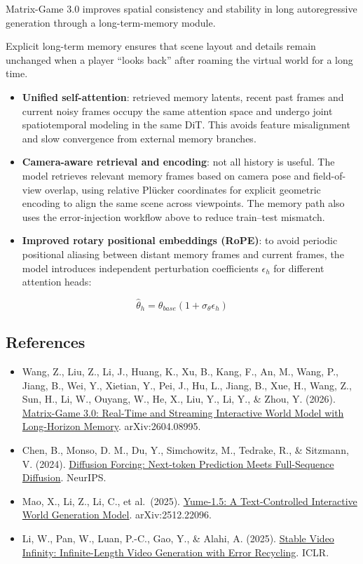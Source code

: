 Matrix-Game 3.0 improves spatial consistency and stability in long autoregressive generation through a long-term-memory module.

Explicit long-term memory ensures that scene layout and details remain unchanged when a player ``looks back'' after roaming the virtual world for a long time.

\begin{itemize}
\tightlist
\item
  \textbf{Unified self-attention}: retrieved memory latents, recent past frames and current noisy frames occupy the same attention space and undergo joint spatiotemporal modeling in the same DiT. This avoids feature misalignment and slow convergence from external memory branches.
\item
  \textbf{Camera-aware retrieval and encoding}: not all history is useful. The model retrieves relevant memory frames based on camera pose and field-of-view overlap, using relative Plücker coordinates for explicit geometric encoding to align the same scene across viewpoints. The memory path also uses the error-injection workflow above to reduce train--test mismatch.
\item
  \textbf{Improved rotary positional embeddings (RoPE)}: to avoid periodic positional aliasing between distant memory frames and current frames, the model introduces independent perturbation coefficients \(\epsilon_h\) for different attention heads:
\end{itemize}

\[
\hat{\theta}_h = \theta_{base}(1 + \sigma_{\theta}\epsilon_h)
\]

\FloatBarrier
{}
\hypertarget{references-144}{%
\subsection{References}\label{references-144}}

\vspace{0.25em}
\begin{itemize}
\tightlist
\item
  Wang, Z., Liu, Z., Li, J., Huang, K., Xu, B., Kang, F., An, M., Wang, P., Jiang, B., Wei, Y., Xietian, Y., Pei, J., Hu, L., Jiang, B., Xue, H., Wang, Z., Sun, H., Li, W., Ouyang, W., He, X., Liu, Y., Li, Y., \& Zhou, Y. (2026). \href{https://arxiv.org/abs/2604.08995}{Matrix-Game 3.0: Real-Time and Streaming Interactive World Model with Long-Horizon Memory}. arXiv:2604.08995.
\item
  Chen, B., Monso, D. M., Du, Y., Simchowitz, M., Tedrake, R., \& Sitzmann, V. (2024). \href{https://arxiv.org/abs/2407.01392}{Diffusion Forcing: Next-token Prediction Meets Full-Sequence Diffusion}. NeurIPS.
\item
  Mao, X., Li, Z., Li, C., et al.~(2025). \href{https://arxiv.org/abs/2512.22096}{Yume-1.5: A Text-Controlled Interactive World Generation Model}. arXiv:2512.22096.
\item
  Li, W., Pan, W., Luan, P.-C., Gao, Y., \& Alahi, A. (2025). \href{https://arxiv.org/abs/2510.09212}{Stable Video Infinity: Infinite-Length Video Generation with Error Recycling}. ICLR.
\end{itemize}

\clearpage
